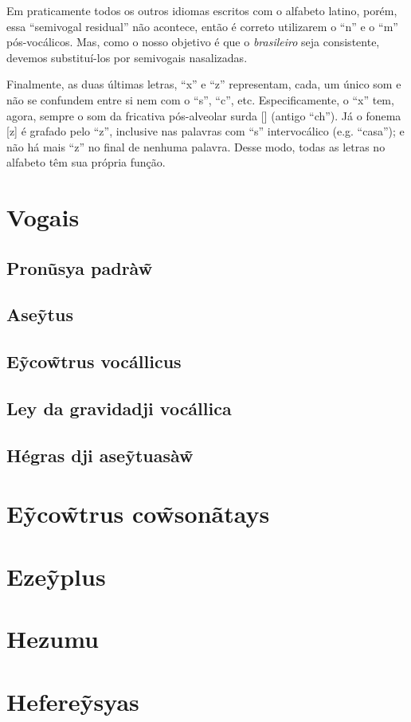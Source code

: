 \documentclass[12pt, a5paper, titlepage]{article}
\begin{document}
\begin{bilingualpages}

    Em praticamente todos os outros idiomas escritos com o alfabeto latino, porém, essa ``semivogal residual'' não acontece, então é correto utilizarem o ``n'' e o ``m'' pós-vocálicos. Mas, como o nosso objetivo é que o \textit{brasileiro} seja consistente, devemos substituí-los por semivogais nasalizadas.

    Finalmente, as duas últimas letras, ``x'' e ``z'' representam, cada, um único som e não se confundem entre si nem com o ``s'', ``c'', etc. Especificamente, o ``x'' tem, agora, sempre o som da fricativa pós-alveolar surda [\textesh] (antigo ``ch''). Já o fonema [z] é grafado pelo ``z'', inclusive nas palavras com ``s'' intervocálico (e.g. ``casa''); e não há mais ``z'' no final de nenhuma palavra. Desse modo, todas as letras no alfabeto têm sua própria função.

    \section{Vogais}
    \subsection{Pronũsya padrà\~w}
    \subsection{Ase\~ytus}
    \subsection{E\~yco\~wtrus vocállicus}
    \subsection{Ley da gravidadji vocállica}
    \subsection{Hégras dji ase\~ytuasà\~w}

    \section{E\~yco\~wtrus co\~wsonãtays}

    \section{Eze\~yplus}
    
\end{bilingualpages}

\newpage
\section{Hezumu}

\newpage
\section{Hefere\~ysyas}
\end{document}
